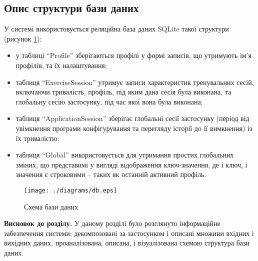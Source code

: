 \subsection{Опис структури бази даних}

У системі використовується реляційна база даних SQLite такої структури (рисунок \ref{fig:db}):
\begin{itemize}
  \item у таблиці ``Profile'' зберігаються профілі у формі записів, що утримують ім'я профілів, та їх налаштування;
  \item таблиця ``ExerciseSession'' утримує записи характеристик тренувальних сесій, включаючи тривалість, профіль, під яким дана сесія була виконана, та глобальну сесію застосунку, під час якої вона була виконана;
  \item таблиця ``ApplicationSession'' зберігає глобальні сесії застосунку (період від увімкнення програми конфігурування та перегляду історії до її вимкнення) із їх тривалістю;
  \item таблиця ``Global'' використовується для утримання простих глобальних зміних, що представимі у вигляді відображення ключ-значення, де і ключ, і значення є строковими -- таких як останній активний профіль.
\end{itemize}
\newpage
\begin{figure}[here]
  \centering
  \texttt{[image: ./diagrams/db.eps]}
  \caption{Схема бази даних}
  \label{fig:db}
\end{figure}

\textbf{Висновок до розділу.} У даному розділі було розглянуто інформаційне забезпечення системи: декомпозовані за застосунком і описані множини вхідних і вихідних даних, проаналізована, описана, і візуалізована схемою структура бази даних.